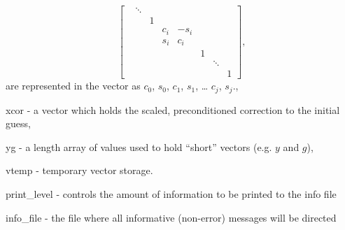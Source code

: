 \begin{args}
\begin{equation*}
\begin{bmatrix}
        & \ddots &   &     &      &   &        &   \\
        &        & 1 &     &      &   &        &   \\
        &        &   & c_i & -s_i &   &        &   \\
        &        &   & s_i &  c_i &   &        &   \\
        &        &   &     &      & 1 &        &   \\
        &        &   &     &      &   & \ddots &   \\
        &        &   &     &      &   &        & 1\end{bmatrix},
    \end{equation*}
    are represented in the  vector as 
    $c_0$,  $s_0$,  $c_1$,
     $s_1$, \ldots {} $c_j$,
     $s_j$.,
  \item[xcor] - a vector which holds the scaled, preconditioned
    correction to the initial guess,
  \item[yg] - a length  array of  values
    used to hold ``short'' vectors (e.g. $y$ and $g$),
  \item[vtemp] - temporary vector storage.
  \item[print\_level] - controls the amount of information to be printed to the info file
  \item[info\_file]   - the file where all informative (non-error) messages will be directed
\end{args}
